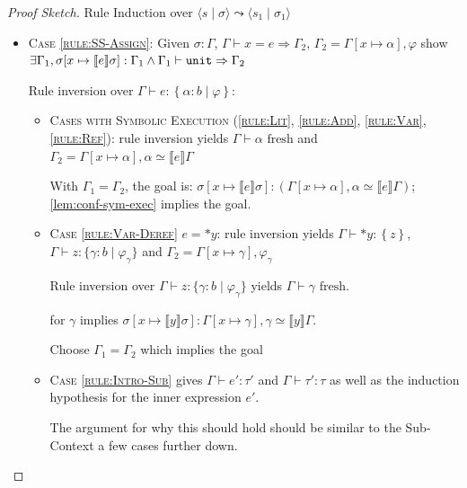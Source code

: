 \documentclass[twoside, english, final]{sdqthesis}
\newcommand{\tuple}[2]{\langle #1 \mid #2 \rangle}
\newcommand{\set}[1]{\left\{ #1 \right\}}
\newcommand{\bbracket}[1]{\llbracket #1 \rrbracket}
\newcommand{\tr}[0]{\triangleright}
\theoremstyle{definition}
\begin{document}
\begin{proof}[Proof Sketch] Rule Induction over $\tuple{s}{\sigma} \leadsto \tuple{s_1}{\sigma_1}$
  
\begin{itemize}
  \item \textsc{Case \cref{rule:SS-Assign}}:
    Given $\sigma : \Gamma$, $\Gamma \vdash x = e \Rightarrow \Gamma_2$, $\Gamma_2 = \Gamma[x \mapsto \alpha], \varphi$
    show $\exists \Gamma_1, \sigma[ x \mapsto \llbracket e \rrbracket \sigma] : \Gamma_1 \wedge \Gamma_1 \vdash \code{unit} \Rightarrow \Gamma_2 $

    Rule inversion over $\Gamma \vdash e : \set{\alpha : b \mid \varphi }$:
    \begin{itemize}
      \item \textsc{Cases with Symbolic Execution (\cref{rule:Lit}, \cref{rule:Add}, \cref{rule:Var}, \cref{rule:Ref})}: rule inversion yields $\Gamma \vdash \alpha \text{ fresh}$ and $\Gamma_2 = \Gamma[x \mapsto \alpha], \alpha \simeq \bbracket{e}\Gamma$

      With $\Gamma_1 = \Gamma_2$, the goal is: $\sigma[x \mapsto \bbracket{e}\sigma ] : (\Gamma[x \mapsto \alpha], \alpha \simeq \llbracket e \rrbracket \Gamma)$; \cref{lem:conf-sym-exec} implies the goal.
      
      \item \textsc{Case \cref{rule:Var-Deref}} $e = *y$:
        rule inversion yields $\Gamma \vdash *y : \set{z}$, $\Gamma \vdash z : \{\gamma : b \mid \varphi_\gamma\}$ and $\Gamma_2 = \Gamma[x \mapsto \gamma], \varphi_\gamma$

        Rule inversion over $\Gamma \vdash z : \{\gamma : b \mid \varphi_\gamma\}$ yields $\Gamma \vdash \gamma \text{ fresh}$.

         for $\gamma$ implies $\sigma[x \mapsto \bbracket{y}\sigma] : \Gamma[x \mapsto \gamma], \gamma \simeq \bbracket{y}\Gamma$.

        Choose $\Gamma_1 = \Gamma_2$ which implies the goal
      \item \textsc{Case \cref{rule:Intro-Sub}}
        gives $\Gamma \vdash e': \tau'$ and $\Gamma \vdash \tau' : \tau$ as well as the induction hypothesis for the inner expression $e'$.
        
        The argument for why this should hold should be similar to the Sub-Context a few cases further down.


\end{itemize}
\end{itemize}
\end{proof}
\end{document}
